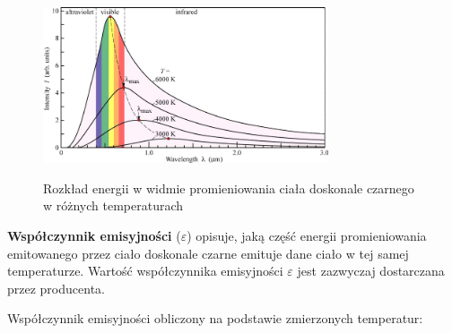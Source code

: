 \vspace{12pt}

\begin{figure}[h!]
    \centering
    \includegraphics[width=0.75\textwidth]{images/wave.png}
    \caption{Rozkład energii w widmie promieniowania ciała doskonale czarnego w różnych temperaturach} \cite{3}
    \label{fig:pomiar}
\end{figure}

\vspace{12pt}

\textbf{Współczynnik emisyjności} ($\varepsilon$) opisuje, jaką część energii promieniowania emitowanego przez ciało doskonale czarne emituje dane ciało w tej samej temperaturze. Wartość współczynnika emisyjności $\varepsilon$ jest zazwyczaj dostarczana przez producenta.

\vspace{12pt}

Współczynnik emisyjności obliczony na podstawie zmierzonych temperatur:


